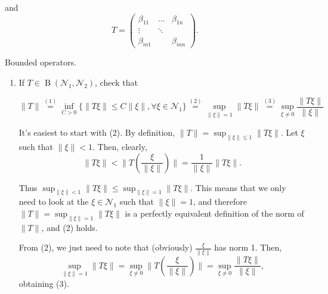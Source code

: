 \documentclass{article}
\theoremstyle{exercisestyle}
\newenvironment{exercise}[1]
  {\renewcommand\theinnerex{#1}\innerex}
  {\endinnerex}
\DeclareMathOperator{\bounded}{B}
\begin{document}
\begin{exercise}{1.1.9}
    and
    \[ T = \begin{pmatrix}
            \beta_{11} & \dots  & \beta_{1n} \\
            \vdots     & \ddots &            \\
            \beta_{m1} &        & \beta_{mn}
        \end{pmatrix}.
    \]

\end{exercise}


\begin{exercise}{1.1.13} Bounded operators.

    \begin{enumerate}
        \item If $T\in \bounded (\mathcal{N}_1, \mathcal{N}_2)$, check that

              $$ \lVert T \rVert \stackrel{(1)}{=} \inf_{C>0} \{ \lVert T\xi \rVert \leq C \lVert \xi \rVert , \forall \xi \in \mathcal{N}_1 \}
                  \stackrel{(2)}{=} \sup_{\lVert \xi \rVert = 1} \lVert T \xi \rVert
                  \stackrel{(3)}{=} \sup_{\xi \neq 0} \frac{\lVert T \xi \rVert}{\lVert \xi \rVert}
              $$

              It's easiest to start with (2). By definition, $\lVert T \rVert = \sup_{\lVert \xi \rVert \leq 1} \lVert T \xi \rVert$. Let $\xi$ such that $\lVert \xi \rVert < 1$.
              Then, clearly, $$\lVert T \xi \rVert < \lVert T\left( \frac{\xi}{\lVert \xi \rVert} \right) \rVert = \frac{1}{\lVert \xi \rVert}  \lVert T \xi \rVert.$$

              Thus $\sup_{\lVert \xi \rVert < 1} \lVert T \xi \rVert \leq \sup_{\lVert \xi \rVert = 1} \lVert T \xi \rVert$.
              This means that we only need to look at the $\xi \in \mathcal{N}_1$ such that $\lVert \xi \rVert = 1$,
              and therefore $\lVert T \rVert = \sup_{\lVert \xi \rVert = 1} \lVert T \xi \rVert$ is a perfectly equivalent definition of the norm of
              $\lVert T \rVert$, and (2) holds.

              From (2), we just need to note that (obviously) $\frac{\xi}{\lVert \xi \rVert}$ has norm 1. Then,
              $$ \sup_{\lVert \xi \rVert = 1} \lVert T \xi \rVert = \sup_{\xi \neq 0} \lVert T \left(\frac{\xi}{\lVert \xi \rVert}\right) \rVert
                  = \sup_{\xi \neq 0}  \frac{\lVert T \xi \rVert}{\lVert \xi \rVert} , $$
              obtaining (3).


\end{enumerate}
\end{exercise}
\end{document}
